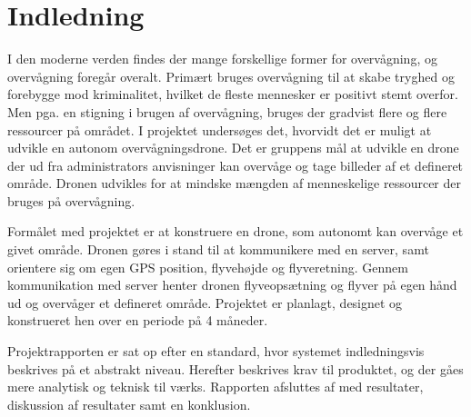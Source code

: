 \chapter{Indledning}
\label{chap:indledning}

I den moderne verden findes der mange forskellige former for overvågning, og overvågning foregår overalt. Primært bruges overvågning til at skabe tryghed og forebygge mod kriminalitet, hvilket de fleste mennesker er positivt stemt overfor. Men pga. en stigning i brugen af overvågning, bruges der gradvist flere og flere ressourcer på området. 
I projektet undersøges det, hvorvidt det er muligt at udvikle en autonom overvågningsdrone. Det er gruppens mål at udvikle en drone der ud fra administrators anvisninger kan overvåge og tage billeder af et defineret område. Dronen udvikles for at mindske mængden af menneskelige ressourcer der bruges på overvågning.

Formålet med projektet er at konstruere en drone, som autonomt kan overvåge et givet område. Dronen gøres i stand til at kommunikere med en server, samt orientere sig om egen GPS position, flyvehøjde og flyveretning. Gennem kommunikation med server henter dronen flyveopsætning og flyver på egen hånd ud og overvåger et defineret område.
Projektet er planlagt, designet og konstrueret hen over en periode på 4 måneder.

Projektrapporten er sat op efter en standard, hvor systemet indledningsvis beskrives på et abstrakt niveau. Herefter beskrives krav til produktet, og der gåes mere analytisk og teknisk til værks. Rapporten afsluttes af med resultater, diskussion af resultater samt en konklusion.


